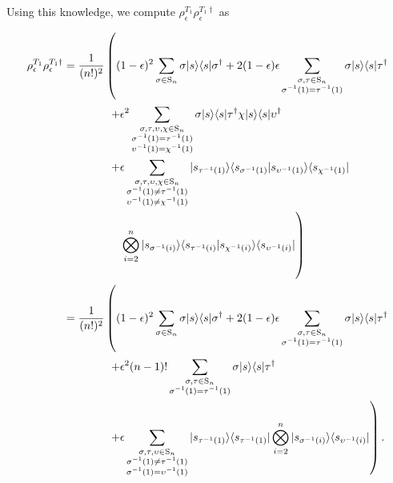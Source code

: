 Using this knowledge, we compute $\rho_{\epsilon}^{T_1}\rho_{\epsilon}^{T_1\dagger}$ as

\begin{align}
\rho_{\epsilon}^{T_1}\rho_{\epsilon}^{T_1\dagger} &= \frac{1}{(n!)^2} \left(\vphantom{\sum_{\substack{a\\b\\c\\d}}}(1-\epsilon)^2\sum_{\sigma\in \textrm{S}_n}\sigma|s\rangle\langle s|\sigma^\dagger + 2(1-\epsilon)\epsilon\sum_{\substack{\sigma,\tau \in \textrm{S}_n\\\sigma^{-1}(1) = \tau^{-1}(1)}}\sigma|s\rangle\langle s|\tau^\dagger\right.\nonumber\\
&\quad\quad\quad\quad\left.+ \epsilon^2\sum_{\substack{\sigma,\tau,\upsilon,\chi \in \textrm{S}_n\\\sigma^{-1}(1) = \tau^{-1}(1)\\\upsilon^{-1}(1) = \chi^{-1}(1)}}\sigma|s\rangle\langle s|\tau^\dagger\chi|s\rangle\langle s|\upsilon^\dagger\right.\nonumber\\
&\quad\quad\quad\quad\left. + \epsilon\sum_{\substack{\sigma,\tau,\upsilon,\chi \in \textrm{S}_n\\\sigma^{-1}(1) \neq \tau^{-1}(1)\\\upsilon^{-1}(1) \neq \chi^{-1}(1)}}|s_{\tau^{-1}(1)}\rangle\langle s_{\sigma^{-1}(1)}|s_{\upsilon^{-1}(1)}\rangle\langle s_{\chi^{-1}(1)}|\right.\nonumber\\
&\quad\quad\quad\quad\quad\left.\bigotimes_{i=2}^n|s_{\sigma^{-1}(i)}\rangle\langle s_{\tau^{-1}(i)}|s_{\chi^{-1}(i)}\rangle\langle s_{\upsilon^{-1}(i)}|\vphantom{\sum_{\substack{a\\b\\c\\d}}}\right)\\
&= \frac{1}{(n!)^2}\left(\vphantom{\sum_{\substack{a\\b\\c\\d}}}(1-\epsilon)^2\sum_{\sigma\in \textrm{S}_n}\sigma|s\rangle\langle s|\sigma^\dagger + 2(1-\epsilon)\epsilon\sum_{\substack{\sigma,\tau \in \textrm{S}_n\\\sigma^{-1}(1) = \tau^{-1}(1)}}\sigma|s\rangle\langle s|\tau^\dagger\right.\nonumber\\
&\quad\quad\quad\quad\left. + \epsilon^2(n-1)!\sum_{\substack{\sigma,\tau \in \textrm{S}_n\\\sigma^{-1}(1) = \tau^{-1}(1)}}\sigma|s\rangle\langle s|\tau^\dagger \right.\nonumber\\
&\quad\quad\quad\quad\left.+ \epsilon\sum_{\substack{\sigma,\tau,\upsilon \in \textrm{S}_n\\\sigma^{-1}(1) \neq \tau^{-1}(1)\\\sigma^{-1}(1) = \upsilon^{-1}(1)}}|s_{\tau^{-1}(1)}\rangle\langle s_{\tau^{-1}(1)}|\bigotimes_{i=2}^n|s_{\sigma^{-1}(i)}\rangle\langle s_{\upsilon^{-1}(i)}|\right).
\end{align}

